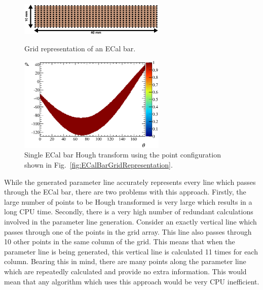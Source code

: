 \begin{figure}
  \centering
  \parbox{7cm}{
    \includegraphics[width=7cm]{images/ecal_hough_transform/ecal_grid_array.eps}
    \caption{Grid representation of an ECal bar.}
    \label{fig:ECalBarGridRepresentation}}
    \qquad
    \begin{minipage}{7cm}
      \includegraphics[width=7cm]{images/ecal_hough_transform/single_ecal_bar_hough_transform.eps}
      \caption{Single ECal bar Hough transform using the point configuration shown in Fig.~\ref{fig:ECalBarGridRepresentation}.}
      \label{fig:ECalBarHoughTransformGridRepresentation}
    \end{minipage}
\end{figure}
\newline
While the generated parameter line accurately represents every line which passes through the ECal bar, there are two problems with this approach.  Firstly, the large number of points to be Hough transformed is very large which results in a long CPU time.  Secondly, there is a very high number of redundant calculations involved in the parameter line generation.  Consider an exactly vertical line which passes through one of the points in the grid array.  This line also passes through 10 other points in the same column of the grid.  This means that when the parameter line is being generated, this vertical line is calculated 11 times for each column.  Bearing this in mind, there are many points along the parameter line which are repeatedly calculated and provide no extra information.  This would mean that any algorithm which uses this approach would be very CPU inefficient.
\newline
